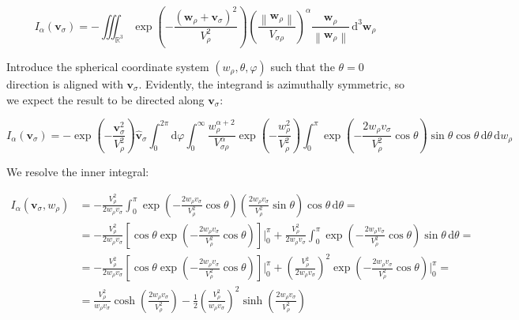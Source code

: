 \begin{equation*}
    I_\alpha(\mathbf{v}_\sigma)=-\iiint_{\mathbb{R}^3}\exp{\left(-\frac{\left(\mathbf{w}_\rho+\mathbf{v}_\sigma\right)^2}{V_\rho^2}\right)}\left(\frac{\left\|\mathbf{w}_\rho\right\|}{V_{\sigma\rho}}\right)^\alpha \frac{\mathbf{w}_\rho}{\left\|\mathbf{w}_\rho\right\|}\,\mathrm{d^3}\mathbf{w}_\rho
\end{equation*}

Introduce the spherical coordinate system $(w_\rho,\theta,\varphi)$ such that the $\theta=0$ direction is aligned with $\mathbf{v}_\sigma$. Evidently, the integrand is azimuthally symmetric, so we expect the result to be directed along $\mathbf{v}_\sigma$:

\begin{equation*}
    I_\alpha(\mathbf{v}_\sigma)=-\exp{\left(-\frac{\mathbf{v}_\sigma^2}{V_\rho^2}\right)}\mathbf{\hat{v}}_\sigma\int_0^{2\pi}\mathrm{d}\varphi\int_0^{\infty}\frac{w_\rho^{\alpha+2}}{V_{\sigma\rho}^\alpha}\exp{\left(-\frac{w_\rho^2}{V_\rho^2}\right)}\int_0^{\pi}\exp{\left(-\frac{2w_\rho v_\sigma}{V_\rho^2}\cos{\theta}\right)}\sin{\theta}\cos{\theta}\,\mathrm{d}\theta\,\mathrm{d}w_\rho
\end{equation*}

We resolve the inner integral:

\begin{align*}
    I_\alpha(\mathbf{v}_\sigma, w_\rho)&=-\frac{V_\rho^2}{2w_\rho v_\sigma}\int_0^\pi\exp{\left(-\frac{2w_\rho v_\sigma}{V_\rho^2}\cos{\theta}\right)}\left(\frac{2w_\rho v_\sigma}{V_\rho^2}\sin{\theta}\right)\cos{\theta}\,\mathrm{d}\theta=\\
    &=-\frac{V_\rho^2}{2w_\rho v_\sigma}\left[\cos{\theta}\exp{\left(-\frac{2w_\rho v_\sigma}{V_\rho^2}\cos{\theta}\right)}\right]\biggr|_{0}^\pi+\frac{V_\rho^2}{2w_\rho v_\sigma}\int_0^\pi\exp{\left(-\frac{2w_\rho v_\sigma}{V_\rho^2}\cos{\theta}\right)}\sin{\theta}\,\mathrm{d}\theta=\\
    &=-\frac{V_\rho^2}{2w_\rho v_\sigma}\left[\cos{\theta}\exp{\left(-\frac{2w_\rho v_\sigma}{V_\rho^2}\cos{\theta}\right)}\right]\biggr|_{0}^\pi+\left(\frac{V_\rho^2}{2w_\rho v_\sigma}\right)^2\exp{\left(-\frac{2w_\rho v_\sigma}{V_\rho^2}\cos{\theta}\right)}\biggr|_0^\pi=\\
    &=\frac{V_\rho^2}{w_\rho v_\sigma}\cosh{\left(\frac{2w_\rho v_\sigma}{V_\rho^2}\right)}-\frac{1}{2}\left(\frac{V_\rho^2}{w_\rho v_\sigma}\right)^2 \sinh{\left(\frac{2w_\rho v_\sigma}{V_\rho^2}\right)}
\end{align*}

